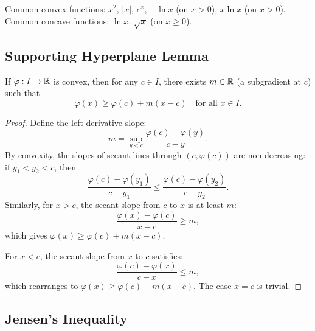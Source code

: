 \documentclass[11pt,a4paper]{article}
\begin{document}
\begin{example}
Common convex functions: $x^2$, $|x|$, $e^x$,
$-\ln x$ (on $x > 0$), $x \ln x$ (on $x > 0$).
Common concave functions: $\ln x$, $\sqrt{x}$ (on $x \geq 0$).
\end{example}

\subsection{Supporting Hyperplane Lemma}
\label{subsec:supporting}

\begin{lemma}
\label{lem:supporting}
If $\varphi: I \to \mathbb{R}$ is convex, then for any $c \in I$, there
exists $m \in \mathbb{R}$ (a subgradient at $c$) such that
\begin{equation}
  \varphi(x) \geq \varphi(c) + m(x - c)
  \quad \text{for all } x \in I.
  \label{eq:supporting}
\end{equation}
\end{lemma}

\begin{proof}
Define the left-derivative slope:
\begin{equation}
  m = \sup_{y < c} \frac{\varphi(c) - \varphi(y)}{c - y}.
  \label{eq:subgradient}
\end{equation}
By convexity, the slopes of secant lines through
$(c, \varphi(c))$ are non-decreasing: if $y_1 < y_2 < c$, then
\begin{equation}
  \frac{\varphi(c) - \varphi(y_1)}{c - y_1}
  \leq \frac{\varphi(c) - \varphi(y_2)}{c - y_2}.
\end{equation}
Similarly, for $x > c$, the secant slope from $c$ to $x$ is at
least $m$:
\begin{equation}
  \frac{\varphi(x) - \varphi(c)}{x - c} \geq m,
\end{equation}
which gives $\varphi(x) \geq \varphi(c) + m(x - c)$.

For $x < c$, the secant slope from $x$ to $c$ satisfies:
\begin{equation}
  \frac{\varphi(c) - \varphi(x)}{c - x} \leq m,
\end{equation}
which rearranges to $\varphi(x) \geq \varphi(c) + m(x - c)$.
The case $x = c$ is trivial.
\end{proof}

\subsection{Jensen's Inequality}
\label{subsec:jensen_thm}
\end{document}
